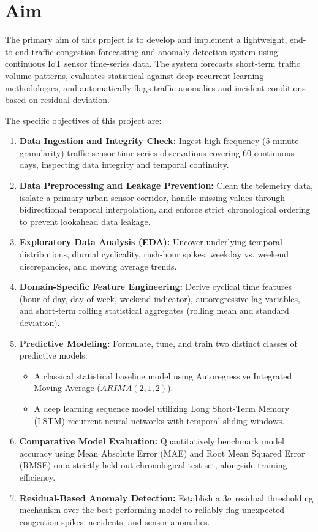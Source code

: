 \documentclass[12pt,a4paper]{article}
\begin{document}
\section{Aim}
The primary aim of this project is to develop and implement a lightweight, end-to-end traffic congestion forecasting and anomaly detection system using continuous IoT sensor time-series data. The system forecasts short-term traffic volume patterns, evaluates statistical against deep recurrent learning methodologies, and automatically flags traffic anomalies and incident conditions based on residual deviation.

The specific objectives of this project are:
\begin{enumerate}
    \item \textbf{Data Ingestion and Integrity Check:} Ingest high-frequency (5-minute granularity) traffic sensor time-series observations covering 60 continuous days, inspecting data integrity and temporal continuity.
    \item \textbf{Data Preprocessing and Leakage Prevention:} Clean the telemetry data, isolate a primary urban sensor corridor, handle missing values through bidirectional temporal interpolation, and enforce strict chronological ordering to prevent lookahead data leakage.
    \item \textbf{Exploratory Data Analysis (EDA):} Uncover underlying temporal distributions, diurnal cyclicality, rush-hour spikes, weekday vs. weekend discrepancies, and moving average trends.
    \item \textbf{Domain-Specific Feature Engineering:} Derive cyclical time features (hour of day, day of week, weekend indicator), autoregressive lag variables, and short-term rolling statistical aggregates (rolling mean and standard deviation).
    \item \textbf{Predictive Modeling:} Formulate, tune, and train two distinct classes of predictive models:
    \begin{itemize}
        \item A classical statistical baseline model using Autoregressive Integrated Moving Average ($ARIMA(2,1,2)$).
        \item A deep learning sequence model utilizing Long Short-Term Memory (LSTM) recurrent neural networks with temporal sliding windows.
    \end{itemize}
    \item \textbf{Comparative Model Evaluation:} Quantitatively benchmark model accuracy using Mean Absolute Error (MAE) and Root Mean Squared Error (RMSE) on a strictly held-out chronological test set, alongside training efficiency.
    \item \textbf{Residual-Based Anomaly Detection:} Establish a $3\sigma$ residual thresholding mechanism over the best-performing model to reliably flag unexpected congestion spikes, accidents, and sensor anomalies.
\end{enumerate}
\end{document}
